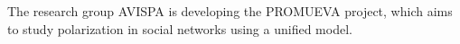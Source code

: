 \documentclass[preview]{standalone}
\begin{document}
The research group AVISPA is developing the PROMUEVA project, which aims to study polarization in social networks using a unified model.\\
\end{document}
